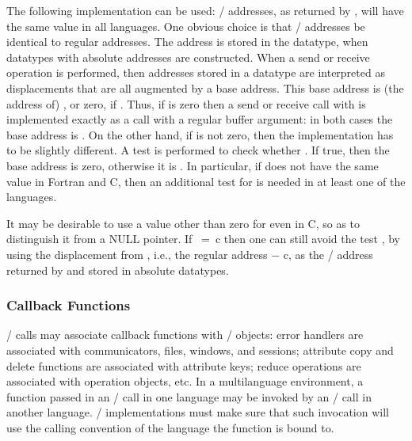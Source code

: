 \begin{implementors}
The following implementation can be used:  \MPI/ addresses, as
returned by , will have
the same value in all languages.
One obvious choice is that
\MPI/ addresses be identical to regular addresses.
The address is stored in the
datatype, when datatypes with absolute addresses are constructed.
When a send or receive operation is performed, then addresses stored in
a datatype are interpreted as displacements that are all augmented by
a base address.  This base address is (the address of) ,
or zero, if \mpicode{ = }.  Thus, if
 is zero then a send or
receive call with \mpicode{ = } is implemented
exactly as a call with a regular buffer argument:  in both cases the
base address is .
On the other
hand, if  is not zero, then the
implementation has to be slightly different.  A test is performed
to check whether \mpicode{ = }.  If true, then
the base address is zero, otherwise it is .
In particular, if  does not have the same value in
Fortran and C,
then an additional test for \mpicode{ = }
is needed in at least one of the languages.

It may be desirable to use a value other than zero for
 even in C,
so as to distinguish it from a NULL
pointer.
If \ =\ c then one can still avoid the test
\mpicode{ = }, by using the displacement from
, i.e., the regular address $-$ c, as the \MPI/ address
returned by  and stored in absolute datatypes.
\end{implementors}


\subsubsection{Callback Functions}

\MPI/ calls may associate callback functions with \MPI/
objects: error handlers are associated with communicators, files, windows, and sessions; attribute copy
and
delete functions are associated with attribute keys; reduce operations
are
associated
with operation objects, etc.  In a multilanguage
environment, a function passed in an \MPI/ call in one language may be
invoked by an \MPI/ call in another language.  \MPI/ implementations
must make sure that such invocation will use the calling convention of
the language the function is bound to.

